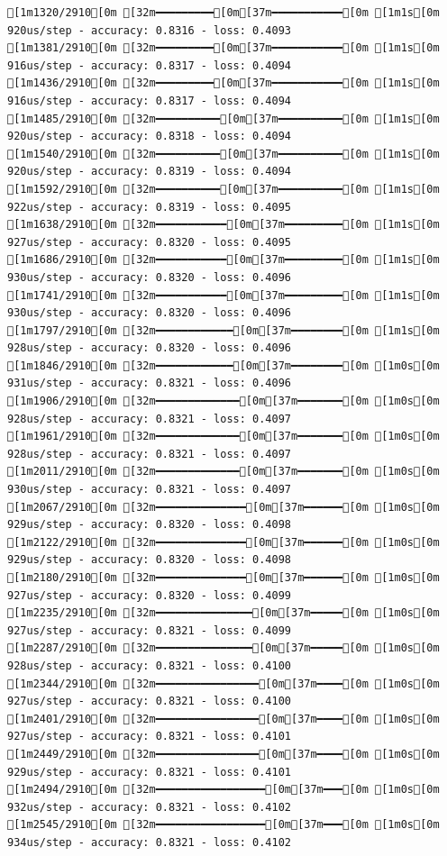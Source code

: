 \documentclass[
  letterpaper,
  DIV=11,
  numbers=noendperiod]{scrartcl}
\begin{document}
\begin{verbatim}
[1m1320/2910[0m [32m━━━━━━━━━[0m[37m━━━━━━━━━━━[0m [1m1s[0m 920us/step - accuracy: 0.8316 - loss: 0.4093
[1m1381/2910[0m [32m━━━━━━━━━[0m[37m━━━━━━━━━━━[0m [1m1s[0m 916us/step - accuracy: 0.8317 - loss: 0.4094
[1m1436/2910[0m [32m━━━━━━━━━[0m[37m━━━━━━━━━━━[0m [1m1s[0m 916us/step - accuracy: 0.8317 - loss: 0.4094
[1m1485/2910[0m [32m━━━━━━━━━━[0m[37m━━━━━━━━━━[0m [1m1s[0m 920us/step - accuracy: 0.8318 - loss: 0.4094
[1m1540/2910[0m [32m━━━━━━━━━━[0m[37m━━━━━━━━━━[0m [1m1s[0m 920us/step - accuracy: 0.8319 - loss: 0.4094
[1m1592/2910[0m [32m━━━━━━━━━━[0m[37m━━━━━━━━━━[0m [1m1s[0m 922us/step - accuracy: 0.8319 - loss: 0.4095
[1m1638/2910[0m [32m━━━━━━━━━━━[0m[37m━━━━━━━━━[0m [1m1s[0m 927us/step - accuracy: 0.8320 - loss: 0.4095
[1m1686/2910[0m [32m━━━━━━━━━━━[0m[37m━━━━━━━━━[0m [1m1s[0m 930us/step - accuracy: 0.8320 - loss: 0.4096
[1m1741/2910[0m [32m━━━━━━━━━━━[0m[37m━━━━━━━━━[0m [1m1s[0m 930us/step - accuracy: 0.8320 - loss: 0.4096
[1m1797/2910[0m [32m━━━━━━━━━━━━[0m[37m━━━━━━━━[0m [1m1s[0m 928us/step - accuracy: 0.8320 - loss: 0.4096
[1m1846/2910[0m [32m━━━━━━━━━━━━[0m[37m━━━━━━━━[0m [1m0s[0m 931us/step - accuracy: 0.8321 - loss: 0.4096
[1m1906/2910[0m [32m━━━━━━━━━━━━━[0m[37m━━━━━━━[0m [1m0s[0m 928us/step - accuracy: 0.8321 - loss: 0.4097
[1m1961/2910[0m [32m━━━━━━━━━━━━━[0m[37m━━━━━━━[0m [1m0s[0m 928us/step - accuracy: 0.8321 - loss: 0.4097
[1m2011/2910[0m [32m━━━━━━━━━━━━━[0m[37m━━━━━━━[0m [1m0s[0m 930us/step - accuracy: 0.8321 - loss: 0.4097
[1m2067/2910[0m [32m━━━━━━━━━━━━━━[0m[37m━━━━━━[0m [1m0s[0m 929us/step - accuracy: 0.8320 - loss: 0.4098
[1m2122/2910[0m [32m━━━━━━━━━━━━━━[0m[37m━━━━━━[0m [1m0s[0m 929us/step - accuracy: 0.8320 - loss: 0.4098
[1m2180/2910[0m [32m━━━━━━━━━━━━━━[0m[37m━━━━━━[0m [1m0s[0m 927us/step - accuracy: 0.8320 - loss: 0.4099
[1m2235/2910[0m [32m━━━━━━━━━━━━━━━[0m[37m━━━━━[0m [1m0s[0m 927us/step - accuracy: 0.8321 - loss: 0.4099
[1m2287/2910[0m [32m━━━━━━━━━━━━━━━[0m[37m━━━━━[0m [1m0s[0m 928us/step - accuracy: 0.8321 - loss: 0.4100
[1m2344/2910[0m [32m━━━━━━━━━━━━━━━━[0m[37m━━━━[0m [1m0s[0m 927us/step - accuracy: 0.8321 - loss: 0.4100
[1m2401/2910[0m [32m━━━━━━━━━━━━━━━━[0m[37m━━━━[0m [1m0s[0m 927us/step - accuracy: 0.8321 - loss: 0.4101
[1m2449/2910[0m [32m━━━━━━━━━━━━━━━━[0m[37m━━━━[0m [1m0s[0m 929us/step - accuracy: 0.8321 - loss: 0.4101
[1m2494/2910[0m [32m━━━━━━━━━━━━━━━━━[0m[37m━━━[0m [1m0s[0m 932us/step - accuracy: 0.8321 - loss: 0.4102
[1m2545/2910[0m [32m━━━━━━━━━━━━━━━━━[0m[37m━━━[0m [1m0s[0m 934us/step - accuracy: 0.8321 - loss: 0.4102

\end{verbatim}
\end{document}
